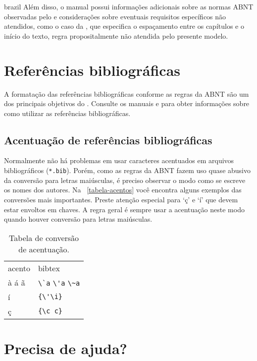 \begin{otherlanguage*}{brazil}
Além disso, o manual possui informações adicionais sobre as normas ABNT
observadas pelo \abnTeX{} e considerações sobre eventuais requisitos específicos
não atendidos, como o caso da , que
especifica o espaçamento entre os capítulos e o início do texto, regra
propositalmente não atendida pelo presente modelo.

\section{Referências bibliográficas}

A formatação das referências bibliográficas conforme as regras da ABNT são um
dos principais objetivos do \abnTeX{}. Consulte os manuais
 e  para obter informações
sobre como utilizar as referências bibliográficas.

\subsection{Acentuação de referências bibliográficas}

Normalmente não há problemas em usar caracteres acentuados em arquivos
bibliográficos (\texttt{*.bib}). Porém, como as regras da ABNT fazem uso quase
abusivo da conversão para letras maiúsculas, é preciso observar o modo como se
escreve os nomes dos autores. Na ~\autoref{tabela-acentos} você encontra alguns
exemplos das conversões mais importantes. Preste atenção especial para `ç' e `í'
que devem estar envoltos em chaves. A regra geral é sempre usar a acentuação
neste modo quando houver conversão para letras maiúsculas.

\begin{table}[htbp]
\caption{Tabela de conversão de acentuação.}
\label{tabela-acentos}

\begin{center}
\begin{tabular}{ll}\hline\hline
acento & \textsf{bibtex}\\
à á ã & \verb+\`a+ \verb+\'a+ \verb+\~a+\\
í & \verb+{\'\i}+\\
ç & \verb+{\c c}+\\
\hline\hline
\end{tabular}
\end{center}
\end{table}


\section{Precisa de ajuda?}


\end{otherlanguage*}
